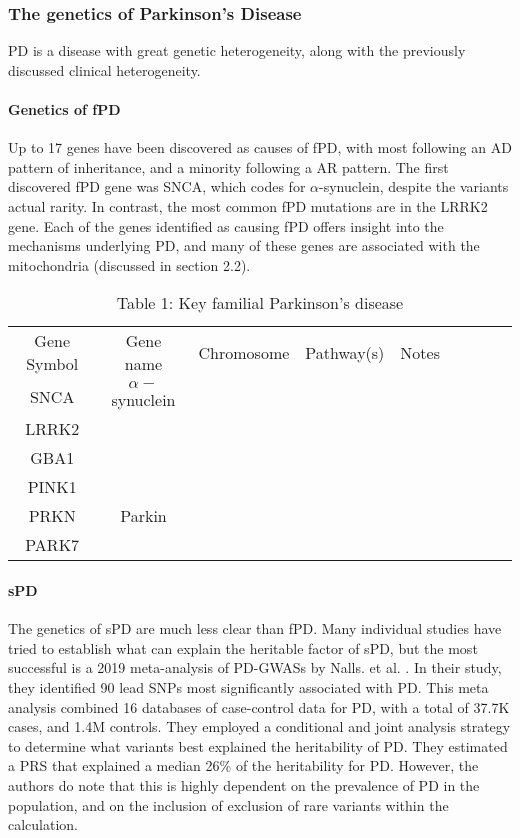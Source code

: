 \documentclass{article}
\begin{document}
\subsubsection{The genetics of Parkinson’s Disease}
PD is a disease with great genetic heterogeneity, along with the previously discussed clinical heterogeneity. 
\paragraph{Genetics of fPD}Up to 17 genes have been discovered as causes of fPD\cite{Day2021ThePractice}, with most following an AD pattern of inheritance, and a minority following a AR pattern. The first discovered fPD gene was SNCA, which codes for $\alpha$-synuclein, despite the variants actual rarity. In contrast, the most common fPD mutations are in the LRRK2 gene\cite{Klein2012GeneticsDisease}. Each of the genes identified as causing fPD offers insight into the mechanisms underlying PD, and many of these genes are associated with the mitochondria (discussed in section 2.2).
\begin{table}[h]
    \begin{tabular}{ |c|c|c|c|c|c|c|c|c| }
        \hline
        Gene Symbol & Gene name & Chromosome & Pathway(s) & Notes \\
        SNCA & $\alpha-$synuclein \\
        LRRK2 \\
        GBA1 \\
        PINK1 \\
        PRKN & Parkin \\
        PARK7
        
         \\
         \hline
    \end{tabular}
    \caption{Table 1: Key familial Parkinson's disease }
    \label{tab:my_label}
\end{table}
\paragraph{sPD}The genetics of sPD are much less clear than fPD. Many individual studies have tried to establish what can explain the heritable factor of sPD, but the most successful is a 2019 meta-analysis of PD-GWASs by Nalls. et al. \cite{Nalls2019IdentificationStudies}. In their study, they identified 90 lead SNPs most significantly associated with PD. This meta analysis combined 16 databases of case-control data for PD, with a total of 37.7K cases, and 1.4M controls. They employed a conditional and joint analysis strategy to determine what variants best explained the heritability of PD. They estimated a PRS that explained a median 26\% of the heritability for PD. However, the authors do note that this is highly dependent on the prevalence of PD in the population, and on the inclusion of exclusion of rare variants within the calculation.
\end{document}
